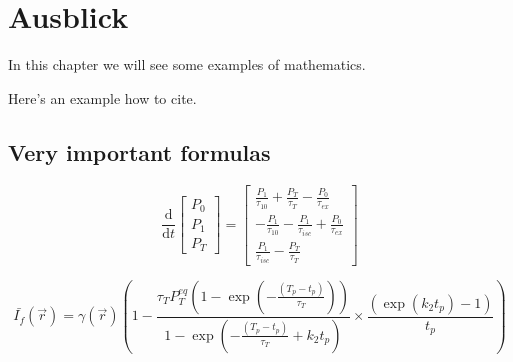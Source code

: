 \chapter*{Ausblick}

In this chapter we will see some examples of mathematics.

Here's an example how to cite.~\cite{atc13}

\lipsum[1]

\section{Very important formulas}
\lipsum[2]

\begin{equation}\label{eqn:rate_eqns}
	\frac{\textrm{d}}{\textrm{d}t}\left[
	\begin{array}{l}
		P_{\textit{0}} \\
		P_{\textit{1}} \\
		P_{\textit{T}}
	\end{array}
	\right] =
	\left[
	\begin{array}{l}
		\frac{P_{\textit{1}}}{\tau_{\textit{10}}} + \frac{P_{\textit{T}}}{\tau_{\textit{T}}} - \frac{P_{\textit{0}}}{\tau_{\textit{ex}}} \\
		- \frac{P_{\textit{1}}}{\tau_{\textit{10}}} - \frac{P_{\textit{1}}}{\tau_{isc}} + \frac{P_{\textit{0}}}{\tau_{\textit{ex}}} \\
		\frac{P_{\textit{1}}}{\tau_{isc}} -  \frac{P_{\textit{T}}}{\tau_{\textit{T}}}
	\end{array}
	\right]
\end{equation}

\lipsum[3]


\begin{equation}\label{eqn:avgfluorescence}
	\bar{I_{f}}(\vec{r})
	= \gamma(\vec{r}) \left(1 - \frac{\tau_{\textit{T}} P_{\textit{T}}^{{eq}}\left(1-\exp \left(-\frac{(T_p - t_p)}{\tau_{\textit{T}}}\right)\right)}{1-\exp\left(-\frac{(T_p - t_p)}{\tau_{\textit{T}}} + k_{\textit{2}} t_p\right)} \times \frac{\left(\exp\left(k_{\textit{2}} t_p\right)-1\right)}{t_p} \right)
\end{equation}

\lipsum[3]
